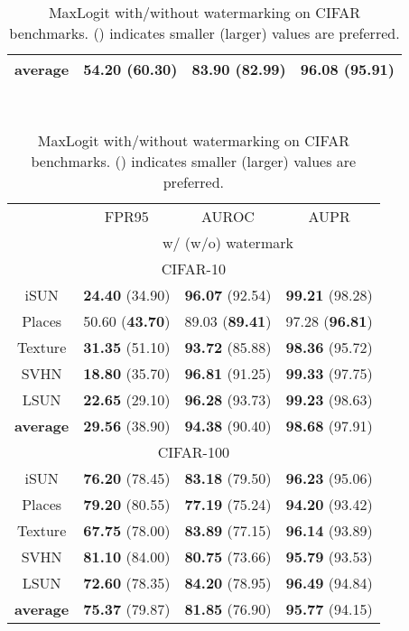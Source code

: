 \documentclass{article}
\begin{document}
\begin{table}[t]
{{\begin{tabular}{c|ccc}
\midrule
\textbf{average}   & \textbf{54.20} (60.30) & \textbf{83.90} (82.99) & \textbf{96.08} (95.91) \\  \bottomrule[1.5pt]      
\end{tabular}
}}~~~~
\parbox{.47\linewidth}{
    \centering
\caption{{MaxLogit with/without watermarking  on CIFAR benchmarks.  () indicates smaller (larger) values are preferred.}} \label{tab: maxlogit}
\vspace{5pt}
\scriptsize
{
\begin{tabular}{c|ccc}
\toprule[1.5pt]
                   & FPR95      & AUROC        & AUPR       \\
                   \cline{2-4} 
\multirow{-2}{*}{} & \multicolumn{3}{c}{w/ (w/o) watermark} \\
\midrule[0.6pt]
\multicolumn{4}{c}{\cellcolor{greyL}CIFAR-10} \\
\midrule[0.6pt]
iSUN               & \textbf{24.40} (34.90) & \textbf{96.07} (92.54) & \textbf{99.21} (98.28) \\ 
Places        & 50.60 (\textbf{43.70}) & 89.03 (\textbf{89.41}) & 97.28 (\textbf{96.81}) \\ 
Texture            & \textbf{31.35} (51.10) & \textbf{93.72} (85.88) & \textbf{98.36} (95.72) \\ 
SVHN               & \textbf{18.80} (35.70) & \textbf{96.81} (91.25) & \textbf{99.33} (97.75) \\ 
LSUN               & \textbf{22.65} (29.10) & \textbf{96.28} (93.73) & \textbf{99.23} (98.63) \\ 
\midrule
\textbf{average}   & \textbf{29.56} (38.90) & \textbf{94.38} (90.40) & \textbf{98.68} (97.91) \\  \midrule[1pt]
\multicolumn{4}{c}{\cellcolor{greyL}CIFAR-100} \\
\midrule[1pt]
iSUN               & \textbf{76.20} (78.45) & \textbf{83.18} (79.50) & \textbf{96.23} (95.06) \\ 
Places        & \textbf{79.20} (80.55) & \textbf{77.19} (75.24) & \textbf{94.20} (93.42) \\ 
Texture            & \textbf{67.75} (78.00) & \textbf{83.89} (77.15) & \textbf{96.14} (93.89) \\ 
SVHN               & \textbf{81.10} (84.00) & \textbf{80.75} (73.66) & \textbf{95.79} (93.53) \\ 
LSUN               & \textbf{72.60} (78.35) & \textbf{84.20} (78.95) & \textbf{96.49} (94.84) \\ 
\midrule
\textbf{average}   & \textbf{75.37} (79.87) & \textbf{81.85} (76.90) & \textbf{95.77} (94.15) \\  \bottomrule[1.5pt]      
\end{tabular}
}}
\end{table}
\end{document}
